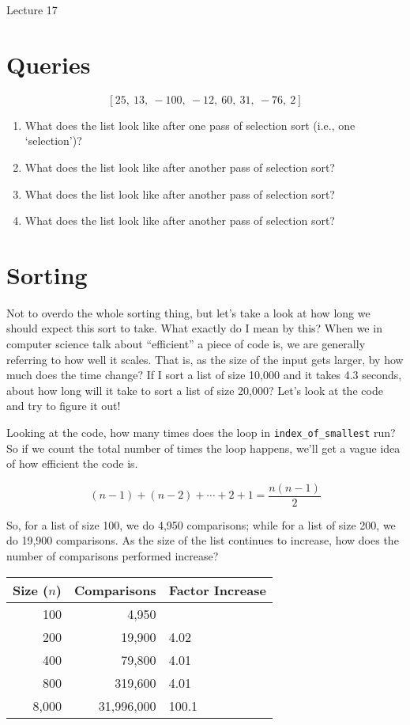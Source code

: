 \documentclass[12pt]{article}
\begin{document}
\begin{center}
   \LARGE Lecture 17
\end{center}

\section*{Queries}

\[[25,\ 13,\ -100,\ -12,\ 60,\ 31,\ -76,\ 2]\]
\begin{enumerate}[nosep]
   \item What does the list look like after one pass of selection sort (i.e.,
      one `selection')?
   \item What does the list look like after another pass of selection sort?
   \item What does the list look like after another pass of selection sort?
   \item What does the list look like after another pass of selection sort?
\end{enumerate}
\section{Sorting}

Not to overdo the whole sorting thing, but let's take a look at how long we
should expect this sort to take.  What exactly do I mean by this?  When we in
computer science talk about ``efficient'' a piece of code is, we are generally
referring to how well it scales.  That is, as the size of the input gets
larger, by how much does the time change?  If I sort a list of size 10,000 and
it takes 4.3 seconds, about how long will it take to sort a list of size
20,000?  Let's look at the code and try to figure it out!



\noindent
Looking at the code, how many times does the loop in
\lstinline{index_of_smallest} run?  So if we count the total number of times
the loop happens, we'll get a vague idea of how efficient the code is.

\[(n - 1) + (n - 2) + \cdots + 2 + 1 = \frac{n(n-1)}{2}\]

So, for a list of size 100, we do 4,950 comparisons; while for a list of size
200, we do 19,900 comparisons.  As the size of the list continues to increase,
how does the number of comparisons performed increase?
\vspace{2ex}

\begin{tabular}{r r l}
   Size ($n$) & Comparisons & Factor Increase\\\midrule
   100 & 4,950 &\\
   200 & 19,900 & 4.02\\
   400 & 79,800 & 4.01\\
   800 & 319,600 & 4.01\\
   8,000 & 31,996,000 & 100.1\\
\end{tabular}
\vspace{2ex}
\end{document}
